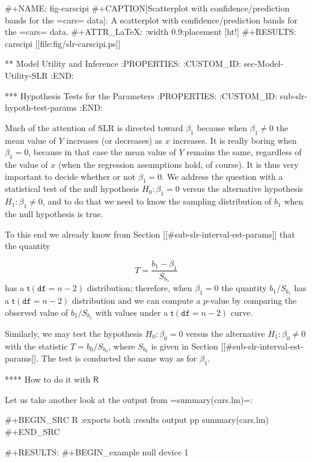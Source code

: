 #+NAME: fig-carscipi
#+CAPTION[Scatterplot with confidence/prediction bands for the =cars= data]: \small A scatterplot with confidence/prediction bands for the =cars= data.
#+ATTR_LaTeX: :width 0.9\textwidth :placement [ht!]
#+RESULTS: carscipi
[[file:fig/slr-carscipi.ps]]

** Model Utility and Inference
:PROPERTIES:
:CUSTOM_ID: sec-Model-Utility-SLR
:END:

*** Hypothesis Tests for the Parameters
:PROPERTIES:
:CUSTOM_ID: sub-slr-hypoth-test-params
:END:

Much of the attention of SLR is directed toward \(\beta_{1}\) because
when \( \beta_{1}\neq 0 \) the mean value of \(Y\) increases (or
decreases) as \(x\) increases. It is really boring when
\(\beta_{1}=0\), because in that case the mean value of \(Y\) remains
the same, regardless of the value of \(x\) (when the regression
assumptions hold, of course). It is thus very important to decide
whether or not \( \beta_{1} = 0 \). We address the question with a
statistical test of the null hypothesis \(H_{0}:\beta_{1}=0\) versus
the alternative hypothesis \(H_{1}:\beta_{1}\neq0\), and to do that we
need to know the sampling distribution of \(b_{1}\) when the null
hypothesis is true.

To this end we already know from Section [[#sub-slr-interval-est-params]] that
the quantity

\begin{equation} 
T=\frac{b_{1}-\beta_{1}}{S_{b_{1}}}
\end{equation}
has a \(\mathsf{t}(\mathtt{df}=n-2)\) distribution; therefore, when
\(\beta_{1}=0\) the quantity \(b_{1}/S_{b_{1}}\) has a
\(\mathsf{t}(\mathtt{df}=n-2)\) distribution and we can compute a
\(p\)-value by comparing the observed value of \(b_{1}/S{}_{b_{1}}\)
with values under a \(\mathsf{t}(\mathtt{df}=n-2)\) curve.

Similarly, we may test the hypothesis \(H_{0}:\beta_{0}=0\) versus the
alternative \(H_{1}:\beta_{0}\neq0\) with the statistic
\(T=b_{0}/S_{b_{0}}\), where \(S_{b_{0}}\) is given in Section [[#sub-slr-interval-est-params]]. The test is conducted the same way as for
\(\beta_{1}\).

**** How to do it with \(\mathsf{R}\)

Let us take another look at the output from =summary(cars.lm)=:

#+BEGIN_SRC R :exports both :results output pp 
summary(cars.lm)
#+END_SRC

#+RESULTS:
#+BEGIN_example
null device 
          1


